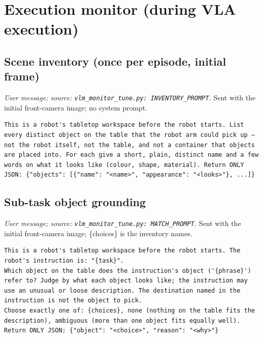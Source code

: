 \section{Execution monitor (during VLA execution)}
\subsection*{Scene inventory (once per episode, initial frame)}
\noindent\textit{User message; source: \texttt{vlm\_monitor\_tune.py: INVENTORY\_PROMPT}.} Sent with the initial front-camera image; no system prompt.
\begin{lstlisting}[style=prompt]
This is a robot's tabletop workspace before the robot starts. List every distinct object on the table that the robot arm could pick up — not the robot itself, not the table, and not a container that objects are placed into. For each give a short, plain, distinct name and a few words on what it looks like (colour, shape, material). Return ONLY JSON: {"objects": [{"name": "<name>", "appearance": "<looks>"}, ...]}
\end{lstlisting}
\subsection*{Sub-task object grounding}
\noindent\textit{User message; source: \texttt{vlm\_monitor\_tune.py: MATCH\_PROMPT}.} Sent with the initial front-camera image; \{choices\} is the inventory names.
\begin{lstlisting}[style=prompt]
This is a robot's tabletop workspace before the robot starts. The robot's instruction is: "{task}".
Which object on the table does the instruction's object ('{phrase}') refer to? Judge by what each object looks like; the instruction may use an unusual or loose description. The destination named in the instruction is not the object to pick.
Choose exactly one of: {choices}, none (nothing on the table fits the description), ambiguous (more than one object fits equally well).
Return ONLY JSON: {"object": "<choice>", "reason": "<why>"}
\end{lstlisting}
